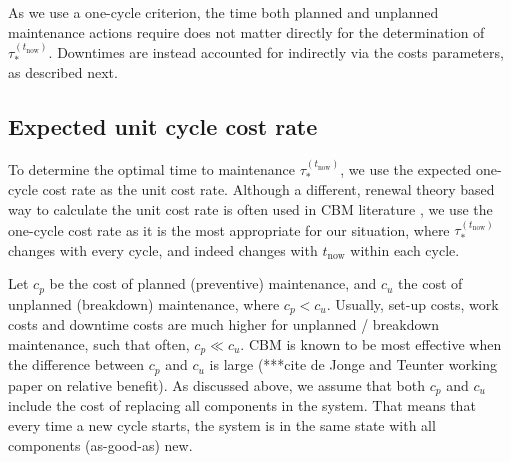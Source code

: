 \documentclass[authoryear]{elsarticle}
\def\tnow{t_\text{now}}
\newcommand{\Rsysnow}{R^{(t_\text{now})}_\text{sys}}
\newcommand{\tausnow}{\tau_*^{(\tnow)}}
\begin{document}
As we use a one-cycle criterion, the time both planned and unplanned maintenance actions require
does not matter directly for the determination of $\tausnow$.
Downtimes are instead accounted for indirectly via the costs parameters,
as described next.



\subsection{Expected unit cycle cost rate}
\label{sec:costrate}

To determine the optimal time to maintenance $\tausnow$,
we use the expected one-cycle cost rate 
\citep{1984:ansell-bendell-humble,1996:mazzuchi-soyer,2006:coolen-schrijner-coolen}
as the unit cost rate.
Although a different, renewal theory based way to calculate the unit cost rate is often used
in CBM literature \citep[e.g.,][]{2013:si-et-al,2011:kim-et-al},
we use the one-cycle cost rate as it is the most appropriate for our situation,
where $\tausnow$ changes with every cycle, and indeed changes with $\tnow$ within each cycle.

Let $c_p$ be the cost of planned (preventive) maintenance, and $c_u$ the cost of unplanned (breakdown) maintenance, where $c_p < c_u$.
Usually, set-up costs, work costs and downtime costs are much higher for unplanned / breakdown maintenance,
such that often, $c_p \ll c_u$.
CBM is known to be most effective when the difference between $c_p$ and $c_u$ is large
(***cite de Jonge and Teunter working paper on relative benefit).
%
As discussed above,
we assume that both $c_p$ and $c_u$ include the cost of replacing all components in the system.
That means that every time a new cycle starts, the system is in the same state with all components (as-good-as) new.
\end{document}
